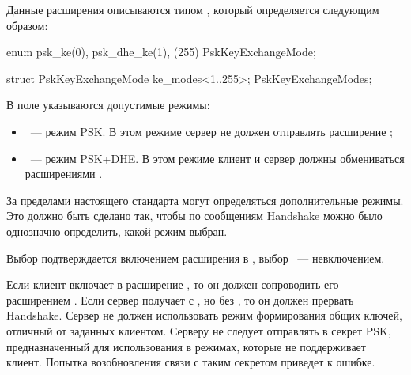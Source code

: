 Данные расширения  описываются типом 
, который определяется следующим образом: 

\begin{codeblock}
enum { psk_ke(0), psk_dhe_ke(1), (255) } PskKeyExchangeMode;

struct {
    PskKeyExchangeMode ke_modes<1..255>;
} PskKeyExchangeModes;
\end{codeblock}

В поле  указываются допустимые режимы:
\begin{itemize}
\item
{}~--- режим PSK. В этом режиме сервер не должен отправлять 
расширение ; 
\item
{}~--- режим PSK+DHE. В этом режиме клиент и сервер должны 
обмениваться расширениями .
\end{itemize}

За пределами настоящего стандарта могут определяться дополнительные режимы.
Это должно быть сделано так, чтобы по сообщениям Handshake можно было 
однозначно определить, какой режим выбран. 

\begin{note*}
Выбор  подтверждается включением расширения 
 в , выбор 
~--- невключением.
\end{note*}

Если клиент включает в  расширение 
, то он должен сопроводить его 
расширением .
%
Если сервер получает  с 
, но без , 
то он должен прервать Handshake. 
%
Сервер не должен использовать режим формирования общих ключей,
отличный от заданных клиентом. 
%
Серверу не следует отправлять в 
секрет PSK, предназначенный для использования в режимах, которые не 
поддерживает клиент. Попытка возобновления связи с таким секретом
приведет к ошибке.


